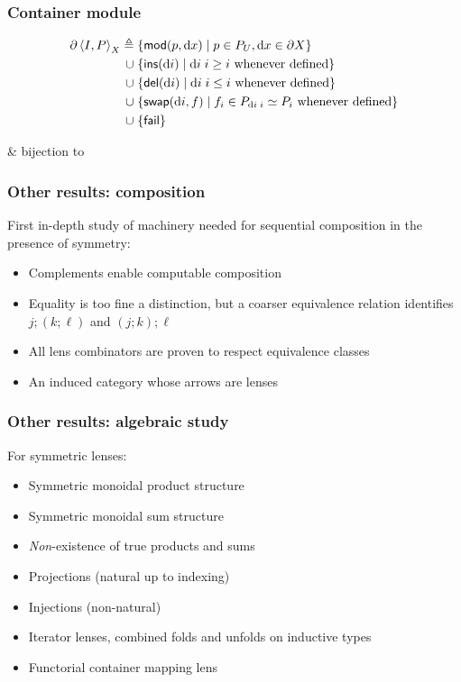 \documentclass[table]{beamer}
\begin{document}
\begin{frame}
    \frametitle{Container module}
    \begin{align*}
        \partial\left<I,P\right>_X
            \triangleq{}&
                \{\mathsf{mod}(p,\textrm{d} x) \mid p \in P_U, \textrm{d} x \in \partial X\}
            \\ \mathrel{\cup}{}&
                \{\mathsf{ins}(\textrm{d} i) \mid \textrm{d} i\;i \ge i\mbox{ whenever defined}\}
            \\ \mathrel{\cup}{}&
                \{\mathsf{del}(\textrm{d} i) \mid \textrm{d} i\;i \le i\mbox{ whenever defined}\}
            \\ \mathrel{\cup}{}&
                \{\mathsf{swap}(\textrm{d} i,f) \mid f_i \in P_{\textrm{d} i\;i} \simeq P_i
                \mbox{ whenever defined} \}
            \\ \mathrel{\cup}{}&
                \{\mathsf{fail}\}
    \end{align*}

    \begin{pronunciation}
        \simeq & bijection to
    \end{pronunciation}
\end{frame}

\begin{frame}
    \frametitle{Other results: composition}
    First in-depth study of machinery needed for sequential composition in
    the presence of symmetry:
    \begin{itemize}
        \item Complements enable computable composition
        \item Equality is too fine a distinction, but a coarser equivalence
            relation identifies $j;(k;\ell)$ and $(j;k);\ell$
        \item All lens combinators are proven to respect equivalence classes
        \item An induced category whose arrows are lenses
    \end{itemize}
\end{frame}

\begin{frame}
    \frametitle{Other results: algebraic study}
    For symmetric lenses:
    \begin{itemize}
        \item Symmetric monoidal product structure
        \item Symmetric monoidal sum structure
        \item \emph{Non}-existence of true products and sums
        \item Projections (natural up to indexing)
        \item Injections (non-natural)
        \item Iterator lenses, combined folds and unfolds on inductive types
        \item Functorial container mapping lens
    \end{itemize}
\end{frame}
\end{document}
